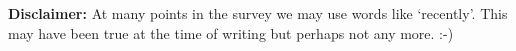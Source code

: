 {\bf Disclaimer:} At many points in the survey we may use words like `recently'. This may have been true at the time of writing but perhaps not any more. :-)





